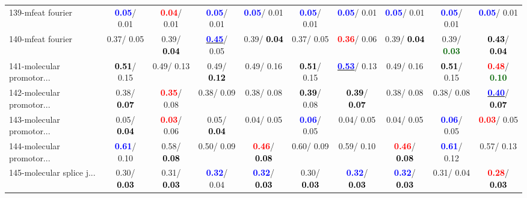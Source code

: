 \begin{table}[h]
\begin{center}
{\begin{tabular}{lc|c|c|c|c|c|c|c|c}
139-mfeat fourier & \textcolor{blue}{\textbf{  0.05}}/  0.01 & \textcolor{red}{\textbf{  0.04}}/  0.01 & \textcolor{blue}{\textbf{  0.05}}/  0.01 & \textcolor{blue}{\textbf{  0.05}}/  0.01 & \textcolor{blue}{\textbf{  0.05}}/  0.01 & \textcolor{blue}{\textbf{  0.05}}/  0.01 & \textcolor{blue}{\textbf{  0.05}}/  0.01 & \textcolor{blue}{\textbf{  0.05}}/  0.01 & \textcolor{blue}{\textbf{  0.05}}/  0.01 \\
140-mfeat fourier &   0.37/  0.05 &   0.39/\textcolor{black}{\textbf{  0.04}} & \underline{\textcolor{blue}{\textbf{  0.45}}}/  0.05 &   0.39/\textcolor{black}{\textbf{  0.04}} &   0.37/  0.05 & \textcolor{red}{\textbf{  0.36}}/  0.06 &   0.39/\textcolor{black}{\textbf{  0.04}} &   0.39/\textcolor{darkgreen}{\textbf{  0.03}} & \textcolor{black}{\textbf{  0.43}}/\textcolor{black}{\textbf{  0.04}} \\
141-molecular promotor... & \textcolor{black}{\textbf{  0.51}}/  0.15 &   0.49/  0.13 &   0.49/\textcolor{black}{\textbf{  0.12}} &   0.49/  0.16 & \textcolor{black}{\textbf{  0.51}}/  0.15 & \underline{\textcolor{blue}{\textbf{  0.53}}}/  0.13 &   0.49/  0.16 & \textcolor{black}{\textbf{  0.51}}/  0.15 & \textcolor{red}{\textbf{  0.48}}/\textcolor{darkgreen}{\textbf{  0.10}} \\
142-molecular promotor... &   0.38/\textcolor{black}{\textbf{  0.07}} & \textcolor{red}{\textbf{  0.35}}/  0.08 &   0.38/  0.09 &   0.38/  0.08 & \textcolor{black}{\textbf{  0.39}}/  0.08 & \textcolor{black}{\textbf{  0.39}}/\textcolor{black}{\textbf{  0.07}} &   0.38/  0.08 &   0.38/  0.08 & \underline{\textcolor{blue}{\textbf{  0.40}}}/\textcolor{black}{\textbf{  0.07}} \\ \hline
143-molecular promotor... &   0.05/\textcolor{black}{\textbf{  0.04}} & \textcolor{red}{\textbf{  0.03}}/  0.06 &   0.05/\textcolor{black}{\textbf{  0.04}} &   0.04/  0.05 & \textcolor{blue}{\textbf{  0.06}}/  0.05 &   0.04/  0.05 &   0.04/  0.05 & \textcolor{blue}{\textbf{  0.06}}/  0.05 & \textcolor{red}{\textbf{  0.03}}/  0.05 \\
144-molecular promotor... & \textcolor{blue}{\textbf{  0.61}}/  0.10 &   0.58/\textcolor{black}{\textbf{  0.08}} &   0.50/  0.09 & \textcolor{red}{\textbf{  0.46}}/\textcolor{black}{\textbf{  0.08}} &   0.60/  0.09 &   0.59/  0.10 & \textcolor{red}{\textbf{  0.46}}/\textcolor{black}{\textbf{  0.08}} & \textcolor{blue}{\textbf{  0.61}}/  0.12 &   0.57/  0.13 \\
145-molecular splice j... &   0.30/\textcolor{black}{\textbf{  0.03}} &   0.31/\textcolor{black}{\textbf{  0.03}} & \textcolor{blue}{\textbf{  0.32}}/  0.04 & \textcolor{blue}{\textbf{  0.32}}/\textcolor{black}{\textbf{  0.03}} &   0.30/\textcolor{black}{\textbf{  0.03}} & \textcolor{blue}{\textbf{  0.32}}/\textcolor{black}{\textbf{  0.03}} & \textcolor{blue}{\textbf{  0.32}}/\textcolor{black}{\textbf{  0.03}} &   0.31/  0.04 & \textcolor{red}{\textbf{  0.28}}/\textcolor{black}{\textbf{  0.03}} \\

\end{tabular}}
\end{center}
\end{table}
